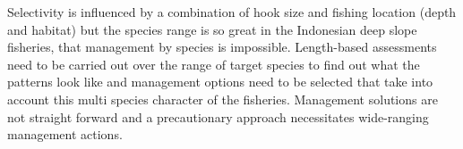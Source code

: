 Selectivity is influenced by a combination of hook size and fishing location (depth and habitat) but the species range is so great in the Indonesian deep slope fisheries, that management by species is impossible. Length-based assessments need to be carried out over the range of target species to find out what the patterns look like and management options need to be selected that take into account this multi species character of the fisheries. Management solutions are not straight forward and a precautionary approach necessitates wide-ranging management actions.
